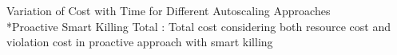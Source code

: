 Variation of Cost with Time for Different Autoscaling Approaches \\
*Proactive Smart Killing Total : Total cost considering both resource cost and violation cost in proactive approach with smart killing